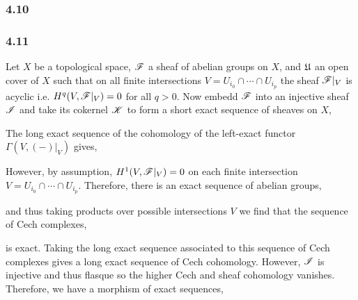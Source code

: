 \documentclass[12pt]{article}
\begin{document}
\subsubsection{4.10}

\subsubsection{4.11}

Let $X$ be a topological space, $\mathscr{F}$ a sheaf of abelian groups on $X$, and $\mathfrak{U}$ an open cover of $X$ such that on all finite intersections $V = U_{i_0} \cap \cdots \cap U_{i_p}$ the sheaf $\mathscr{F}|_V$ is acyclic i.e. $H^q(V, \mathscr{F}|_V) = 0$ for all $q > 0$. Now embedd $\mathscr{F}$ into an injective sheaf $\mathscr{I}$ and take its cokernel $\mathscr{K}$ to form a short exact sequence of sheaves on $X$,
\begin{center}
\end{center}
The long exact sequence of the cohomology of the left-exact functor $\Gamma(V, (-)|_V)$ gives,
\begin{center}
\end{center} 
However, by assumption, $H^1(V, \mathscr{F}|_V) = 0$ on each finite intersection $V = U_{i_0} \cap \cdots \cap U_{i_p}$. Therefore, there is an exact sequence of abelian groups,
\begin{center}
\end{center} 
and thus taking products over possible intersections $V$ we find that the sequence of Cech complexes,
\begin{center}
\end{center}
is exact. Taking the long exact sequence associated to this sequence of Cech complexes gives a long exact sequence of Cech cohomology. However, $\mathscr{I}$ is injective and thus flasque so the higher Cech and sheaf cohomology vanishes. Therefore, we have a morphism of exact sequences,
\end{document}

